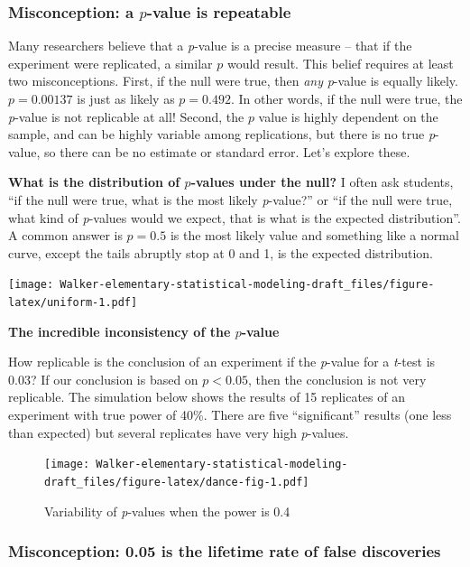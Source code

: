 \documentclass[]{book}
\begin{document}
\hypertarget{misconception-a-p-value-is-repeatable}{%
\subsubsection{\texorpdfstring{Misconception: a \(p\)-value is repeatable}{Misconception: a p-value is repeatable}}\label{misconception-a-p-value-is-repeatable}}

Many researchers believe that a \emph{p}-value is a precise measure -- that if the experiment were replicated, a similar \(p\) would result. This belief requires at least two misconceptions. First, if the null were true, then \emph{any} \emph{p}-value is equally likely. \(p=0.00137\) is just as likely as \(p=0.492\). In other words, if the null were true, the \emph{p}-value is not replicable at all! Second, the \(p\) value is highly dependent on the sample, and can be highly variable among replications, but there is no true \emph{p}-value, so there can be no estimate or standard error. Let's explore these.

\textbf{What is the distribution of \(p\)-values under the null?} I often ask students, ``if the null were true, what is the most likely \emph{p}-value?'' or ``if the null were true, what kind of \emph{p}-values would we expect, that is what is the expected distribution''. A common answer is \(p=0.5\) is the most likely value and something like a normal curve, except the tails abruptly stop at 0 and 1, is the expected distribution.

\texttt{[image: Walker-elementary-statistical-modeling-draft\_files/figure-latex/uniform-1.pdf]}

\textbf{The incredible inconsistency of the \(p\)-value}

How replicable is the conclusion of an experiment if the \emph{p}-value for a \emph{t}-test is 0.03? If our conclusion is based on \(p < 0.05\), then the conclusion is not very replicable. The simulation below shows the results of 15 replicates of an experiment with true power of 40\%. There are five ``significant'' results (one less than expected) but several replicates have very high \emph{p}-values.

\begin{figure}
\centering
\texttt{[image: Walker-elementary-statistical-modeling-draft\_files/figure-latex/dance-fig-1.pdf]}
\caption{\label{fig:dance-fig}Variability of \emph{p}-values when the power is 0.4}
\end{figure}

\hypertarget{misconception-0.05-is-the-lifetime-rate-of-false-discoveries}{%
\subsubsection{Misconception: 0.05 is the lifetime rate of false discoveries}\label{misconception-0.05-is-the-lifetime-rate-of-false-discoveries}}
\end{document}
